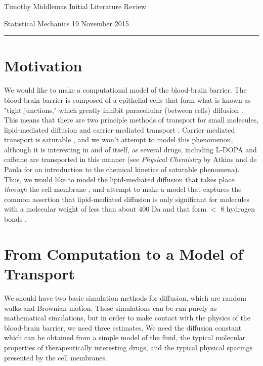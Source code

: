 \documentclass[letter]{article}
\begin{document}
                                                             

\noindent Timothy Middlemas \hfill Initial Literature Review

\noindent Statistical Mechanics \hfill 19 November 2015

\vspace{1 mm}

\hrule

\vspace{1 mm}

\section{Motivation}
We would like to make a computational model of the blood-brain barrier. The blood brain barrier is composed of a epithelial cells that form what is known as "tight junctions," which greatly inhibit paracellular (between cells) diffusion \cite{PajouheshLenz2005}. This means that there are two principle methods of transport for small molecules, lipid-mediated diffusion and carrier-mediated transport \cite{Pardridge2012}. Carrier mediated transport is saturable \cite{Pardridge2012}, and we won't attempt to model this phenomenon, although it is interesting in and of itself, as several drugs, including L-DOPA \cite{Pardridge2005} and caffeine \cite{McCallMillingtonWurtman1982} are transported in this manner (see \textit{Physical Chemistry} by Atkins and de Paula for an introduction to the chemical kinetics of saturable phenomena). Thus, we would like to model the lipid-mediated diffusion that takes place \textit{through} the cell membrane \cite{PajouheshLenz2005}, and attempt to make a model that captures the common assertion that lipid-mediated diffusion is only significant for molecules with a molecular weight of less than about $400$ Da and that form $<$ 8 hydrogen bonds \cite{Pardridge2012}.
\section{From Computation to a Model of Transport}
We should have two basic simulation methods for diffusion, which are random walks and Brownian motion. These simulations can be run purely as mathematical simulations, but in order to make contact with the physics of the blood-brain barrier, we need three estimates. We need the diffusion constant which can be obtained from a simple model of the fluid, the typical molecular properties of therapeutically interesting drugs, and the typical physical spacings presented by the cell membranes.
\end{document}
